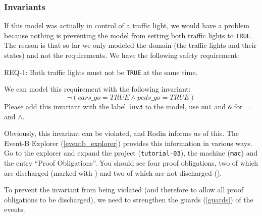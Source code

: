 \subsubsection{Invariants}
\label{tutorial:invariants}

If this model was actually in control of a traffic light, we would have a problem because nothing is preventing the model from setting both traffic lights to \texttt{TRUE}.  The reason is that so far we only modeled the domain (the traffic lights and their states) and not the requirements.  We have the following safety requirement:

\begin{center}REQ-1: Both traffic lights must not be \texttt{TRUE} at the same time.\end{center}

We can model this requirement with the following invariant:
\[
\lnot  (cars\_go = TRUE \land  peds\_go = TRUE)
\]
Please add this invariant with the label \texttt{inv3} to the model, use \texttt{not} and \texttt{\&} for $\lnot$ and $\land$.

Obviously, this invariant can be violated, and Rodin informs us of this.  The \textsf{Event-B Explorer} (\ref{eventb_explorer}) provides this information in various ways.  Go to the explorer and expand the project (\texttt{tutorial-03}), the machine (\texttt{mac}) and the entry ``Proof Obligations''.
You should see four proof obligations, two of which are discharged (marked with ) and two of which are not discharged ().


To prevent the invariant from being violated (and therefore to allow all proof obligations to be discharged), we need to strengthen the guards (\ref{guards}) of the events.

